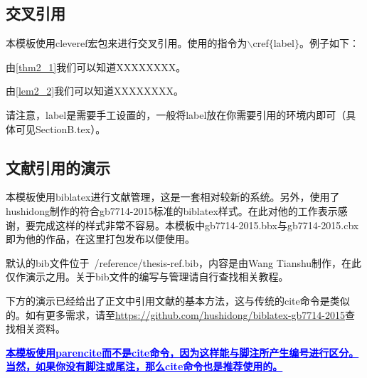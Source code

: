 \subsection{交叉引用}
\par 本模板使用cleveref宏包来进行交叉引用。使用的指令为$\backslash$cref$\{$label$\}$。例子如下：
\par 由\cref{thm2_1}我们可以知道XXXXXXXX。
\par 由\cref{lem2_2}我们可以知道XXXXXXXX。
\par 请注意，label是需要手工设置的，一般将label放在你需要引用的环境内即可（具体可见SectionB.tex）。

\subsection{文献引用的演示}
\par 本模板使用biblatex进行文献管理，这是一套相对较新的系统。另外，使用了hushidong制作的符合gb7714-2015标准的biblatex样式。在此对他的工作表示感谢，要完成这样的样式非常不容易。本模板中gb7714-2015.bbx与gb7714-2015.cbx即为他的作品，在这里打包发布以便使用。
\par 默认的bib文件位于~/reference/thesis-ref.bib，内容是由Wang Tianshu制作，在此仅作演示之用。关于bib文件的编写与管理请自行查找相关教程。
\par 下方的演示已经给出了正文中引用文献的基本方法，这与传统的cite命令是类似的。如有更多需求，请至\url{https://github.com/hushidong/biblatex-gb7714-2015}查找相关资料。
\par \textcolor{blue}{\textbf{\uline{本模板使用parencite而不是cite命令，因为这样能与脚注所产生编号进行区分。当然，如果你没有脚注或尾注，那么cite命令也是推荐使用的。}}}


